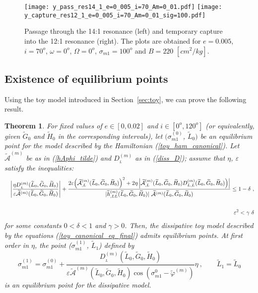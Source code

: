 \documentclass[12pt,reqno]{amsart}
\numberwithin{equation}{section}
\newtheorem{theorem}{Theorem}%
\newcommand\beqa[1]{ \begin{eqnarray} \label{#1}}
\newcommand{\eeqa}{ \end{eqnarray} }
\newcommand\equ[1]{{\rm (\ref{#1})}}
\def\A{{\mathcal A}}
\begin{document}
\begin{figure}[h]
\centering {} 
\texttt{[image: y\_pass\_res14\_1\_e=0\_005\_i=70\_Am=0\_01.pdf]}
\texttt{[image: y\_capture\_res12\_1\_e=0\_005\_i=70\_Am=0\_01\_sig=100.pdf]}
\caption{Passage through the 14:1 resonance (left) and temporary capture into the 12:1 resonance (right). The plots are obtained for $e=0.005$, $i=70^o$, $\omega=0^o$, $\Omega=0^o$, $\sigma_{m1}=100^o$ and $B=220$ $[cm^2/kg]$. } \label{fig:pass_capture}
\end{figure}





\subsection{Existence of equilibrium points} \label{sec:existence}
Using the toy model introduced in Section~\ref{sec:toy}, we can prove the following result.

\begin{theorem} \label{Theorem:existence}
For fixed values of $e\in [0,0.02]$ and $i\in [0^o,120^o]$ (or equivalently, given $\widetilde{G}_0$
and $\widetilde{H}_0$ in the corresponding intervals), let  $(\sigma_{m1}^{(0)}$, $\widetilde{L}_0)$ be an equilibrium point for
the model described by the Hamiltonian \equ{toy_ham_canonical}. Let $\widetilde{\mathcal{A}}^{(m)}$
be as in \equ{hAphi_tilde} and $D^{(m)}_{_L}$ as in \equ{diss_D}; assume that
$\eta$, $\varepsilon$ satisfy the inequalities:
\beqa{existence_condition}
&&\left| \frac{\eta D^{(m)}_{_L} (\widetilde{L}_0, \widetilde{G}_0, \widetilde{H}_0)}{\varepsilon
\widetilde{\mathcal{A}}^{(m)}(\widetilde{L}_0, \widetilde{G}_0, \widetilde{H}_0)} \right| +  \frac{  2 \varepsilon \Bigl( \widetilde{\A}_{,L}^{(m)}(\widetilde{L}_0, \widetilde{G}_0, \widetilde{H}_0)\Bigr)^2
 +2\eta \left| \widetilde{\A}_{,L}^{(m)}(\widetilde{L}_0, \widetilde{G}_0, \widetilde{H}_0)  D_{L,L}^{(m)}(\widetilde{L}_0, \widetilde{G}_0, \widetilde{H}_0)\Bigr)\right|}{ | \widetilde{h}_{,LL}^{(m)} (\widetilde{L}_0, \widetilde{G}_0, \widetilde{H}_0) | \ \widetilde{\A}^{(m)}(\widetilde{L}_0, \widetilde{G}_0, \widetilde{H}_0)} \leq 1-\delta\ ,\nonumber\\
\nonumber\\
&&\qquad\qquad\varepsilon^2<\gamma\ \delta
\eeqa
for some constants $0<\delta<1$ and $\gamma>0$. Then, the dissipative toy model described by the equations \equ{toy_canonical_eq_final} admits equilibrium points. At first order in $\eta$, the point
($\sigma_{m1}^{(1)}$, $\widetilde{L}_1$) defined by
\begin{equation}\label{eq_L_sigma}
\sigma_{m1}^{(1)}= \sigma_{m1}^{(0)}+ \frac{D^{(m)}_{_L} (\widetilde{L}_0, \widetilde{G}_0, \widetilde{H}_0)}
{\varepsilon  \widetilde{ \mathcal{A}}^{(m)}(\widetilde{L}_0, \widetilde{G}_0, \widetilde{H}_0)
\cos (\sigma_{m1}^0-\widetilde{\varphi}^{(m)}) }\eta \ , \qquad \widetilde{L}_1=\widetilde{L}_0
\end{equation}
is an equilibrium point for the dissipative model.
\end{theorem}
\end{document}
